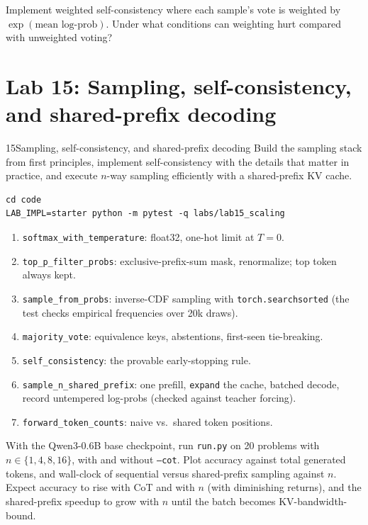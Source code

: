 \begin{exercise}
Implement weighted self-consistency where each sample's vote is weighted by
$\exp(\text{mean log-prob})$. Under what conditions can weighting hurt compared with unweighted
voting?
\end{exercise}

\section{Lab 15: Sampling, self-consistency, and shared-prefix decoding}\label{sec:scaling:lab}

\begin{labbox}{15}{Sampling, self-consistency, and shared-prefix decoding}
Build the sampling stack from first principles, implement self-consistency with the details that
matter in practice, and execute $n$-way sampling efficiently with a shared-prefix KV cache.

\begin{lstlisting}[style=shell]
cd code
LAB_IMPL=starter python -m pytest -q labs/lab15_scaling
\end{lstlisting}

\begin{enumerate}
  \item \texttt{softmax\_with\_temperature}: float32, one-hot limit at $T=0$.
  \item \texttt{top\_p\_filter\_probs}: exclusive-prefix-sum mask, renormalize; top token always kept.
  \item \texttt{sample\_from\_probs}: inverse-CDF sampling with \texttt{torch.searchsorted} (the
  test checks empirical frequencies over 20k draws).
  \item \texttt{majority\_vote}: equivalence keys, abstentions, first-seen tie-breaking.
  \item \texttt{self\_consistency}: the provable early-stopping rule.
  \item \texttt{sample\_n\_shared\_prefix}: one prefill, \texttt{expand} the cache, batched decode,
  record untempered log-probs (checked against teacher forcing).
  \item \texttt{forward\_token\_counts}: naive vs.\ shared token positions.
\end{enumerate}

With the Qwen3-0.6B base checkpoint, run \texttt{run.py} on 20 problems with $n \in \{1,4,8,16\}$,
with and without \texttt{--cot}. Plot accuracy against total generated tokens, and wall-clock of
sequential versus shared-prefix sampling against $n$. Expect accuracy to rise with CoT and with $n$
(with diminishing returns), and the shared-prefix speedup to grow with $n$ until the batch becomes
KV-bandwidth-bound.


\end{labbox}

